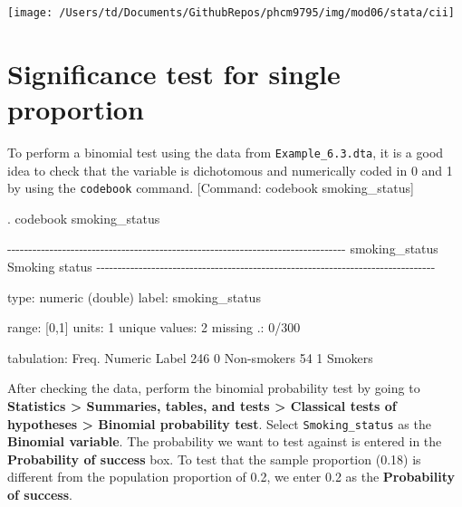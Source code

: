 \documentclass[
]{memoir}
\newenvironment{Shaded}{\begin{snugshade}}{\end{snugshade}}
\newcommand{\NormalTok}[1]{#1}
\begin{document}
\texttt{[image: /Users/td/Documents/GithubRepos/phcm9795/img/mod06/stata/cii]}

\hypertarget{significance-test-for-single-proportion}{%
\section{Significance test for single proportion}\label{significance-test-for-single-proportion}}

To perform a binomial test using the data from \texttt{Example\_6.3.dta}, it is a good idea to check that the variable is dichotomous and numerically coded in 0 and 1 by using the \texttt{codebook} command. {[}Command: codebook smoking\_status{]}

\begin{Shaded}
\begin{Highlighting}[]
\NormalTok{. codebook smoking\_status }

\NormalTok{{-}{-}{-}{-}{-}{-}{-}{-}{-}{-}{-}{-}{-}{-}{-}{-}{-}{-}{-}{-}{-}{-}{-}{-}{-}{-}{-}{-}{-}{-}{-}{-}{-}{-}{-}{-}{-}{-}{-}{-}{-}{-}{-}{-}{-}{-}{-}{-}{-}{-}{-}{-}{-}{-}{-}{-}{-}{-}{-}{-}{-}{-}{-}{-}{-}{-}{-}{-}{-}{-}{-}{-}{-}{-}{-}{-}{-}{-}{-}{-}}
\NormalTok{smoking\_status                                                    Smoking status}
\NormalTok{{-}{-}{-}{-}{-}{-}{-}{-}{-}{-}{-}{-}{-}{-}{-}{-}{-}{-}{-}{-}{-}{-}{-}{-}{-}{-}{-}{-}{-}{-}{-}{-}{-}{-}{-}{-}{-}{-}{-}{-}{-}{-}{-}{-}{-}{-}{-}{-}{-}{-}{-}{-}{-}{-}{-}{-}{-}{-}{-}{-}{-}{-}{-}{-}{-}{-}{-}{-}{-}{-}{-}{-}{-}{-}{-}{-}{-}{-}{-}{-}}

\NormalTok{                  type:  numeric (double)}
\NormalTok{                 label:  smoking\_status}

\NormalTok{                 range:  [0,1]                        units:  1}
\NormalTok{         unique values:  2                        missing .:  0/300}

\NormalTok{            tabulation:  Freq.   Numeric  Label}
\NormalTok{                           246         0  Non{-}smokers}
\NormalTok{                            54         1  Smokers}
\end{Highlighting}
\end{Shaded}

After checking the data, perform the binomial probability test by going to \textbf{Statistics \textgreater{} Summaries, tables, and tests \textgreater{} Classical tests of hypotheses \textgreater{} Binomial probability test}. Select \texttt{Smoking\_status} as the \textbf{Binomial variable}. The probability we want to test against is entered in the \textbf{Probability of success} box. To test that the sample proportion (0.18) is different from the population proportion of 0.2, we enter 0.2 as the \textbf{Probability of success}.
\end{document}
